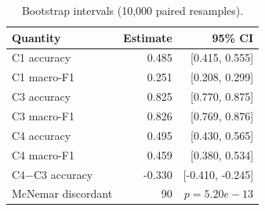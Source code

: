 \begin{table}[t]
\caption{Bootstrap intervals (10,000 paired resamples).}
\label{tab:statistics}
\centering
\scriptsize
\begin{tabular}{lrr}
\toprule
Quantity & Estimate & 95\% CI \\
\midrule
C1 accuracy & 0.485 & [0.415, 0.555] \\
C1 macro-F1 & 0.251 & [0.208, 0.299] \\
C3 accuracy & 0.825 & [0.770, 0.875] \\
C3 macro-F1 & 0.826 & [0.769, 0.876] \\
C4 accuracy & 0.495 & [0.430, 0.565] \\
C4 macro-F1 & 0.459 & [0.380, 0.534] \\
C4$-$C3 accuracy & -0.330 & [-0.410, -0.245] \\
\midrule
McNemar discordant & 90 & $p=5.20e-13$ \\
\bottomrule
\end{tabular}
\end{table}
